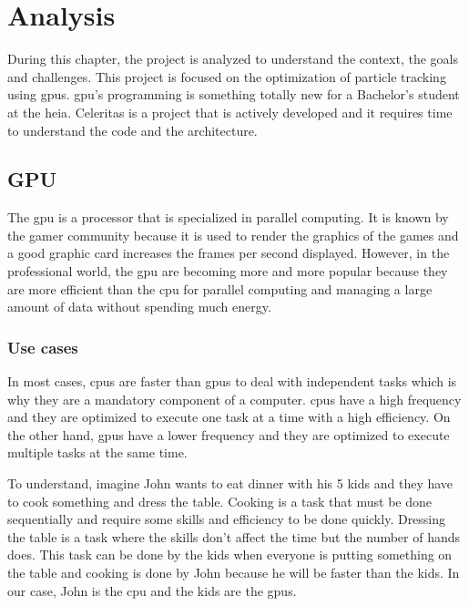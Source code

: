 \chapter{Analysis}
\label{ch:analyze}

During this chapter, the project is analyzed to understand the context, the
goals and challenges.
This project is focused on the optimization of particle tracking using
\acrshort{gpu}s.
\acrshort{gpu}'s programming is something totally new for a Bachelor's
student at the \acrshort{heia}.
Celeritas is a project that is actively developed and it requires time to
understand the code and the architecture.


\section{GPU}
\label{ch:analyze:gpu}

The \acrfull{gpu} is a processor that is specialized in parallel computing.
It is known by the gamer community because it is used to render the graphics of
the games and a good graphic card increases the frames per second displayed.
However, in the professional world, the \acrshort{gpu} are becoming more and
more popular because they are more efficient than the \acrshort{cpu} for
parallel computing and managing a large amount of data without spending much
energy.


\subsection{Use cases}
\label{ch:analyze:gpu:use-cases}

In most cases, \acrshort{cpu}s are faster than \acrshort{gpu}s to deal with
independent tasks which is why they are a mandatory component of a computer.
\acrshort{cpu}s have a high frequency and they are optimized to execute one
task at a time with a high efficiency.
On the other hand, \acrshort{gpu}s have a lower frequency and they are optimized
to execute multiple tasks at the same time.

To understand, imagine John wants to eat dinner with his 5 kids and they have to
cook something and dress the table.
Cooking is a task that must be done sequentially and require some skills and
efficiency to be done quickly.
Dressing the table is a task where the skills don't affect the time but the
number of hands does.
This task can be done by the kids when everyone is putting something on the table
and cooking is done by John because he will be faster than the kids.
In our case, John is the \acrshort{cpu} and the kids are the \acrshort{gpu}s.

